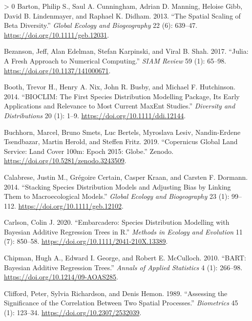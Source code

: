 \documentclass[10pt,oneside]{article}
\newlength{\cslhangindent}
\newenvironment{CSLReferences}[3] %
 {%
  \setlength{\parindent}{0pt}
  \ifodd #1 \everypar{\setlength{\hangindent}{\cslhangindent}}\ignorespaces\fi
  \ifnum #2 > 0
  \setlength{\parskip}{#2\baselineskip}
  \fi
 }%
 {}
\begin{document}
\hypertarget{refs}{}
\begin{CSLReferences}{1}{0}
\leavevmode\hypertarget{ref-Barton2013SpaSca}{}%
Barton, Philip S., Saul A. Cunningham, Adrian D. Manning, Heloise Gibb,
David B. Lindenmayer, and Raphael K. Didham. 2013. {``The Spatial
Scaling of Beta Diversity.''} \emph{Global Ecology and Biogeography} 22
(6): 639--47. \url{https://doi.org/10.1111/geb.12031}.

\leavevmode\hypertarget{ref-Bezanson2017JulFre}{}%
Bezanson, Jeff, Alan Edelman, Stefan Karpinski, and Viral B. Shah. 2017.
{``Julia: A Fresh Approach to Numerical Computing.''} \emph{SIAM Review}
59 (1): 65--98. \url{https://doi.org/10.1137/141000671}.

\leavevmode\hypertarget{ref-Booth2014BioFir}{}%
Booth, Trevor H., Henry A. Nix, John R. Busby, and Michael F.
Hutchinson. 2014. {``BIOCLIM: The First Species Distribution Modelling
Package, Its Early Applications and Relevance to Most Current MaxEnt
Studies.''} \emph{Diversity and Distributions} 20 (1): 1--9.
\url{https://doi.org/10.1111/ddi.12144}.

\leavevmode\hypertarget{ref-Buchhorn2019CopGlo}{}%
Buchhorn, Marcel, Bruno Smets, Luc Bertels, Myroslava Lesiv,
Nandin-Erdene Tsendbazar, Martin Herold, and Steffen Fritz. 2019.
{``Copernicus Global Land Service: Land Cover 100m: Epoch 2015:
Globe.''} Zenodo. \url{https://doi.org/10.5281/zenodo.3243509}.

\leavevmode\hypertarget{ref-Calabrese2014StaSpe}{}%
Calabrese, Justin M., Grégoire Certain, Casper Kraan, and Carsten F.
Dormann. 2014. {``Stacking Species Distribution Models and Adjusting
Bias by Linking Them to Macroecological Models.''} \emph{Global Ecology
and Biogeography} 23 (1): 99--112.
\url{https://doi.org/10.1111/geb.12102}.

\leavevmode\hypertarget{ref-Carlson2020EmbSpe}{}%
Carlson, Colin J. 2020. {``Embarcadero: Species Distribution Modelling
with Bayesian Additive Regression Trees in R.''} \emph{Methods in
Ecology and Evolution} 11 (7): 850--58.
\url{https://doi.org/10.1111/2041-210X.13389}.

\leavevmode\hypertarget{ref-Chipman2010BarBay}{}%
Chipman, Hugh A., Edward I. George, and Robert E. McCulloch. 2010.
{``BART: Bayesian Additive Regression Trees.''} \emph{Annals of Applied
Statistics} 4 (1): 266--98. \url{https://doi.org/10.1214/09-AOAS285}.

\leavevmode\hypertarget{ref-Clifford1989AssSig}{}%
Clifford, Peter, Sylvia Richardson, and Denis Hemon. 1989. {``Assessing
the Significance of the Correlation Between Two Spatial Processes.''}
\emph{Biometrics} 45 (1): 123--34.
\url{https://doi.org/10.2307/2532039}.


\end{CSLReferences}
\end{document}
